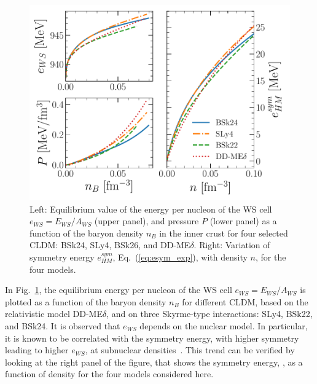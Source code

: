 \begin{figure}[!t]
\begin{center}
  \includegraphics[width=0.9\linewidth]{figures/eos_icrust.pdf}
\end{center}
\caption[Energy per nucleon and pressure versus baryon density in the inner
crust, and symmetry energy at subsaturation densities]{Left: Equilibrium value 
  of the energy per nucleon of the WS cell $e_{WS} =
  E_{WS}/A_{WS}$ (upper panel), and pressure $P$ (lower panel) as a function of 
  the baryon 
density $n_B$ in the inner crust for four selected CLDM: BSk24, SLy4, BSk26,
and DD-ME$\delta$. Right: Variation of symmetry energy $e_{HM}^{sym}$,
Eq.~(\ref{eq:esym_exp}), with density $n$, for the four models.}\label{fig:eos_icrust}
\end{figure}

In Fig.~\ref{fig:eos_icrust}, the equilibrium energy
per nucleon of the WS cell $e_{WS} = E_{WS}/A_{WS}$ is plotted as a function of
the baryon density $n_B$ for different CLDM, based on the relativistic 
model DD-ME$\delta$, and on three Skyrme-type interactions: SLy4, BSk22, and
BSk24. It is observed that $e_{WS}$ depends on the nuclear model. In
particular, it is known to be correlated with the symmetry
energy, with higher symmetry leading to higher $e_{WS}$, at subnuclear
densities~\cite{Pearson2018}. This trend can be verified by looking at the
right panel of the figure, that shows the symmetry energy,
, as a function of density for the four models 
considered here.


